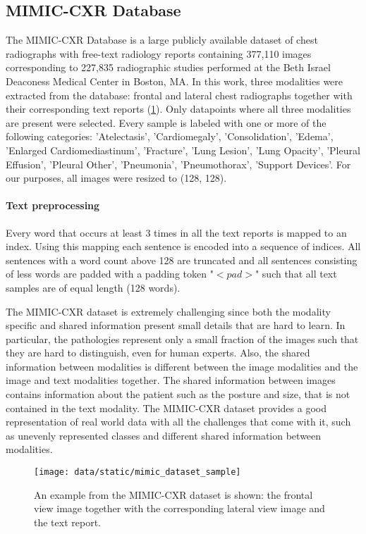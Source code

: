 \subsection{MIMIC-CXR Database}
The MIMIC-CXR Database \citep{johnson2019mimic} is a large publicly available dataset of chest radiographs with free-text radiology reports containing 377,110 images corresponding to 227,835 radiographic studies performed at the Beth Israel Deaconess Medical Center in Boston, MA.
In this work, three modalities were extracted from the database: frontal and lateral chest radiographs together with their corresponding text reports (\cref{fig:mimic}).
Only datapoints where all three modalities are present were selected.
Every sample is labeled with one or more of the following categories: 'Atelectasis', 'Cardiomegaly', 'Consolidation', 'Edema', 'Enlarged Cardiomediastinum', 'Fracture', 'Lung Lesion', 'Lung Opacity', 'Pleural Effusion', 'Pleural Other', 'Pneumonia', 'Pneumothorax', 'Support Devices'.
For our purposes, all images were resized to (128, 128).

\paragraph{Text preprocessing}
Every word that occurs at least 3 times in all the text reports is mapped to an index.
Using this mapping each sentence is encoded into a sequence of indices.
All sentences with a word count above 128 are truncated and all sentences consisting of less words are padded with a padding token "$<pad>$" such that all text samples are of equal length (128 words).

The MIMIC-CXR dataset is extremely challenging since both the modality specific and shared information present small details that are hard to learn.
In particular, the pathologies represent only a small fraction of the images such that they are hard to distinguish, even for human experts.
Also, the shared information between modalities is different between the image modalities and the image and text modalities together.
The shared information between images contains information about the patient such as the posture and size, that is not contained in the text modality.
The MIMIC-CXR dataset provides a good representation of real world data with all the challenges that come with it, such as unevenly represented classes and different shared information between modalities.


\begin{figure}[h!]
    \centering
    \texttt{[image: data/static/mimic\_dataset\_sample]}
    \vspace{-1cm}
    \caption{An example from the MIMIC-CXR dataset is shown: the frontal view image together with the corresponding lateral view image and the text report.}
    \label{fig:mimic}
\end{figure}

